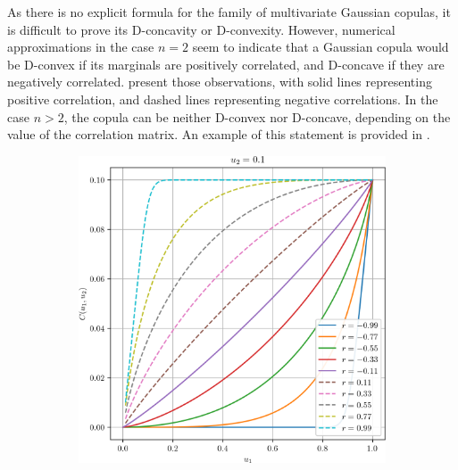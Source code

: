 As there is no explicit formula for the family of multivariate Gaussian copulas, it is difficult to prove its D-concavity or D-convexity. However, numerical approximations in the case $n=2$ seem to indicate that a Gaussian copula would be D-convex if its marginals are positively correlated, and D-concave if they are negatively correlated.  present those observations, with solid lines representing positive correlation, and dashed lines representing negative correlations. In the case $n>2$, the copula can be neither D-convex nor D-concave, depending on the value of the correlation matrix. An example of this statement is provided in .

\begin{figure}
    \centering
    \begin{subfigure}{0.4\linewidth}
        \centering
        \includegraphics[width=\linewidth]{Images/Chap_2/Gaussian_copula/gaussian_copula_0.png}
    \end{subfigure}\hfill
    \begin{subfigure}{0.4\linewidth}
        \centering

\end{subfigure}
\end{figure}
